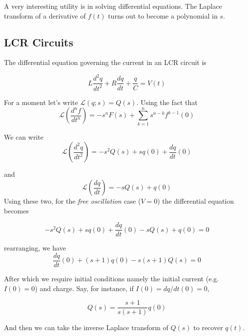 \documentclass[11pt]{article}
\begin{document}
	A very interesting utility is in solving differential equations. The Laplace transform of a derivative of $f(t)$ turns out to become a polynomial in $s$.  
	
	\subsection*{LCR Circuits}
	The differential equation governing the current in an LCR circuit is
	
	\[L\frac{d^2q}{dt^2} + R\frac{dq}{dt} + \frac{q}{C}= V(t)\]
	
	For a moment let's write $\mathcal{L} (q;s) = Q(s)$. Using the fact that \[\mathcal{L}\left( \frac{d^nf}{dt^n} \right) = -s^nF(s) + \sum_{k=1}^n s^{n-k}f^{k-1 }(0)\]
	
	We can write \[\mathcal{L} \left( \frac{d^2 q}{dt^2}\right) = -s^2 Q(s) + sq(0) + \frac{dq}{dt}(0)	\]
	
	and \[ \mathcal{L} (\frac{dq}{dt}) = -sQ(s) +  q(0)\]
	Using these two, for the {\it free oscillation} case ($V=0$) the differential equation becomes
	
	\[ -s^2Q(s) + sq(0) + \frac{dq}{dt}(0) - sQ(s) + q(0) = 0\]
	
	rearranging, we have
	 \[ \frac{dq}{dt}(0) + (s + 1)q(0)  - s(s+1)Q(s) = 0\]
	 
	 After which we require initial conditions \textemdash namely the initial current (e.g. $I(0) = 0$) and charge. Say, for instance, if $I(0) = dq/dt(0) = 0$,
	 
	 \[Q(s) = \frac{s+1}{s(s+1)}q(0)\]
	 
	 And then we can take the inverse Laplace transform of $Q(s)$ to recover $q(t)$.
\end{document}
